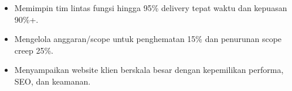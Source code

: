 \begin{itemize}
\item Memimpin tim lintas fungsi hingga 95\% delivery tepat waktu dan kepuasan 90\%+.
\item Mengelola anggaran/scope untuk penghematan 15\% dan penurunan scope creep 25\%.
\end{itemize}
\divider

\begin{itemize}
\item Menyampaikan website klien berskala besar dengan kepemilikan performa, SEO, dan keamanan.
\end{itemize}

\newpage
\switchcolumn
